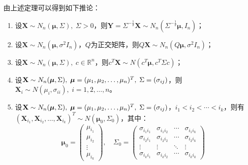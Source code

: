 \begin{corollary}\label{cor:MultiNormalLinearTransform}
	由上述定理可以得到如下推论：
	\begin{enumerate}
		\item 设$\mathbf{X}\sim N_n(\boldsymbol{\mu},\Sigma),\;\Sigma>0$，则$\mathbf{Y}=\Sigma^{-\frac{1}{2}}\mathbf{X}\sim N_n(\Sigma^{-\frac{1}{2}}\boldsymbol{\mu},I_n)$；
		\item 设$\mathbf{X}\sim N_n(\boldsymbol{\mu},\sigma^2I_n)$，$Q$为正交矩阵，则$Q\mathbf{X}\sim N_n(Q\boldsymbol{\mu},\sigma^2I_n)$；
		\item 设$\mathbf{X}\sim N_n(\boldsymbol{\mu},\Sigma),\;c\in \mathbb{R}^{n}$，则$c^T\mathbf{X}\sim N(c^T\boldsymbol{\mu},c^T\Sigma c)$；
		\item 设$\mathbf{X}\sim N_n(\boldsymbol{\mu},\Sigma),\;\boldsymbol{\mu}=(\mu_1, \mu_2, \dots, \mu_{n})^T,\;\Sigma=(\sigma_{ij})$，则$\mathbf{X}_i\sim N(\mu_i,\sigma_{ii}),\;i=1,2,\dots,n$。
		\item 设$\mathbf{X}\sim N_n(\boldsymbol{\mu},\Sigma),\;\boldsymbol{\mu}=(\mu_1, \mu_2, \dots, \mu_{n})^T,\;\Sigma=(\sigma_{ij})$，$i_1<i_2<\cdots<i_k$，则有$(\mathbf{X}_{i_1},\mathbf{X}_{i_2},\dots,\mathbf{X}_{i_k})^T\sim N(\boldsymbol{\mu}_0,\Sigma_0)$，其中：
		\begin{equation*}
			\boldsymbol{\mu}_0=
			\begin{pmatrix}
				\mu_{i_1} \\
				\mu_{i_2} \\
				\vdots \\
				\mu_{i_k}
			\end{pmatrix}
			,\quad
			\Sigma_0=
			\begin{pmatrix}
				\sigma_{i_1i_1} & \sigma_{i_1i_2} & \cdots & \sigma_{i_1i_k} \\
				\sigma_{i_2i_1} & \sigma_{i_2i_2} & \cdots & \sigma_{i_2i_k} \\
				\vdots & \vdots & \ddots & \vdots \\
				\sigma_{i_ki_1} & \sigma_{i_ki_2} & \cdots & \sigma_{i_ki_k}
			\end{pmatrix}
		\end{equation*}
	\end{enumerate}
\end{corollary}
